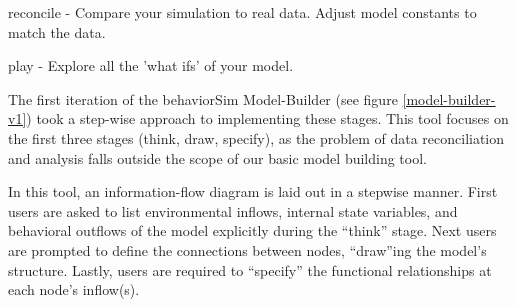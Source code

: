 \documentclass[conference]{IEEEtran}
\begin{document}
reconcile - 
Compare your simulation to real data. 
Adjust model constants to match the data. 

play - 
Explore all the 'what ifs' of your model. 

  
The first iteration of the behaviorSim Model-Builder (see figure \ref{model-builder-v1}) took a step-wise approach to implementing these stages.
This tool focuses on the first three stages (think, draw, specify), as the problem of data reconciliation and analysis falls outside the scope of our basic model building tool.

In this tool, an information-flow diagram is laid out in a stepwise manner.
First users are asked to list environmental inflows, internal state variables, and behavioral outflows of the model explicitly during the ``think'' stage.
Next users are prompted to define the connections between nodes, ``draw''ing the model's structure.
Lastly, users are required to ``specify'' the functional relationships at each node's inflow(s).
\end{document}
